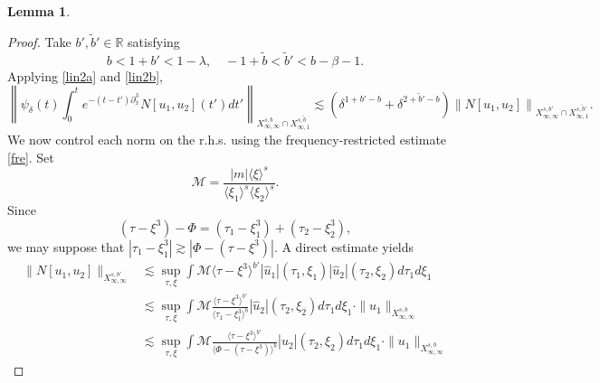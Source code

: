 \documentclass[%
11pt,  reqno]{amsart}
\newcommand{\jap}[1]{\langle #1 \rangle}
\newcommand{\5}{\textup{V}}
\newcommand{\les}{\lesssim}
\newcommand{\wt}{\widetilde}
\newtheorem{lemma}[theorem]{Lemma}
\theoremstyle{remark}
\newtheorem{remark}[theorem]{Remark}
\newcommand{\R}{\mathbb{R}}
\numberwithin{equation}{section}
\numberwithin{theorem}{section}
\begin{document}
{\begin{lemma}
		\end{lemma}
		\begin{proof}
Take $b', \tilde{b}'\in \R$ satisfying
			$$
			 b < 1+b'< 1-\lambda,\quad -1+\wt{b}<\wt{b}'<b-\beta-1.
$$
        Applying \eqref{lin2a} and \eqref{lin2b},
        $$
        \left\|\psi_\delta(t)\int_0^t e^{-(t-t')\partial_x^3}N[u_1,u_2](t')dt' \right\|_{X^{s,b}_{\infty, \infty} \cap X^{s,\tilde{b}}_{\infty,1}}  \lesssim (\delta^{1+b'-b} + \delta^{2+\tilde{b}'-b})\left\|N[u_1,u_2] \right\|_{X^{s,b'}_{\infty, \infty} \cap X^{s,\tilde{b}'}_{\infty,1}}.
        $$
        We now control each norm on the r.h.s. using the frequency-restricted estimate \eqref{fre}.
			Set
			$$
			\mathcal{M}=\frac{|m|\jap{\xi}^s}{\jap{\xi_1}^s\jap{\xi_2}^s}.
			$$
            Since 
            $$(\tau-\xi^3) - \Phi =  (\tau_1-\xi_1^3) + (\tau_2-\xi_2^3),
            $$
            we may suppose that $|\tau_1-\xi_1^3|\gtrsim |\Phi-(\tau-\xi^3)|$.
			A direct estimate yields
			\begin{align}
				\|N[u_1,u_2] \|_{X^{s,b'}_{\infty, \infty}} &\lesssim \sup_{\tau,\xi} \int \mathcal{M}\jap{\tau-\xi^3}^{b'}|\hat{u}_1|(\tau_1,\xi_1) |\hat{u}_2|(\tau_2,\xi_2)d\tau_1 d\xi_1 \\& \lesssim \sup_{\tau,\xi} \int \mathcal{M}\frac{\jap{\tau-\xi^3}^{b'}}{\jap{\tau_1-\xi_1^3}^b  } |\hat{u}_2|(\tau_2,\xi_2)d\tau_1d\xi_1 \cdot  \|u_1\|_{X^{s,b}_{\infty,\infty}}\\& \lesssim \sup_{\tau,\xi} \int \mathcal{M}\frac{\jap{\tau-\xi^3}^{b'}}{\jap{\Phi-(\tau-\xi^3)}^b  } |\hat{u}_2|(\tau_2,\xi_2)d\tau_1d\xi_1 \cdot  \|u_1\|_{X^{s,b}_{\infty,\infty}}

\end{align}
\end{proof}}
\end{document}
